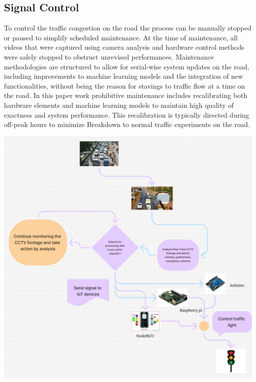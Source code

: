 \documentclass[usenatbib]{tjaa}
\begin{document}
\subsection{Signal Control}
To control the traffic congestion on the road the process can be manually stopped or paused to simplify scheduled maintenance. At the time of maintenance, all videos that were captured using camera analysis and hardware control methods were safely stopped to obstruct unrevised performances. Maintenance methodologies are structured to allow for serial-wise system updates on the road, including improvements to machine learning models and the integration of new functionalities, without being the reason for stavings to traffic flow at a time on the road. In this paper work prohibitive maintenance includes recalibrating both hardware elements and machine learning models to maintain high quality of exactness and system performance. This recalibration is typically directed during off-peak hours to minimize Breakdown to normal traffic experiments on the road.
\vspace{0.5cm}
\begin{minipage}{0.5\textwidth}
    \centering
    \includegraphics[width=\textwidth]{6_.png}
\end{minipage}%
\end{document}
